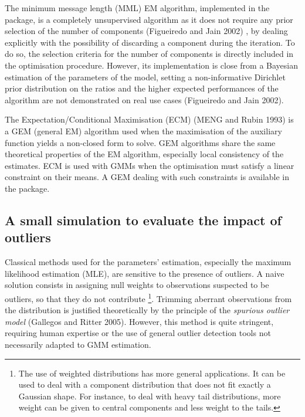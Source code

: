 The minimum message length (MML) EM algorithm, implemented in the
 package, is a completely unsupervised algorithm as it
does not require any prior selection of the number of components
(Figueiredo and Jain 2002) , by dealing explicitly with the possibility of
discarding a component during the iteration. To do so, the selection
criteria for the number of components is directly included in the
optimisation procedure. However, its implementation is close from a
Bayesian estimation of the parameters of the model, setting a
non-informative Dirichlet prior distribution on the ratios and the
higher expected performances of the algorithm are not demonstrated on
real use cases (Figueiredo and Jain 2002).

The Expectation/Conditional Maximisation (ECM) (MENG and Rubin 1993) is a GEM
(general EM) algorithm used when the maximisation of the auxiliary
function yields a non-closed form to solve. GEM algorithms share the
same theoretical properties of the EM algorithm, especially local
consistency of the estimates. ECM is used with GMMs when the
optimisation must satisfy a linear constraint on their means. A GEM
dealing with such constraints is available in the 
package.

\hypertarget{a-small-simulation-to-evaluate-the-impact-of-outliers}{%
\subsection{A small simulation to evaluate the impact of outliers}\label{a-small-simulation-to-evaluate-the-impact-of-outliers}}

Classical methods used for the parameters' estimation, especially the
maximum likelihood estimation (MLE), are sensitive to the presence of
outliers. A naive solution consists in assigning null weights to
observations suspected to be outliers, so that they do not contribute
\footnote{The use of weighted distributions has more general applications.
  It can be used to deal with a component distribution that does not
  fit exactly a Gaussian shape. For instance, to deal with heavy tail
  distributions, more weight can be given to central components and
  less weight to the tails.}. Trimming aberrant observations from the distribution is justified
theoretically by the principle of the \emph{spurious outlier model}
(Gallegos and Ritter 2005). However, this method is quite stringent,
requiring human expertise or the use of general outlier detection tools
not necessarily adapted to GMM estimation.

